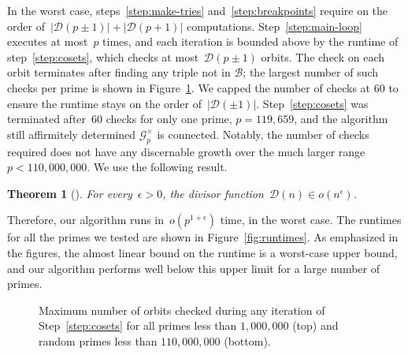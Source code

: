 \documentclass{article}
\newtheorem{theorem}{Theorem}
\theoremstyle{definition}
\theoremstyle{remark}
\begin{document}
In the worst case, steps~\ref{step:make-tries} and~\ref{step:breakpoints} require on the order of~$|\mathcal{D}(p \pm 1)| + |\mathcal{D}(p + 1)|$ computations.
Step~\ref{step:main-loop} executes at most~$p$ times, and each iteration is bounded above by the runtime of step~\ref{step:cosets}, which checks at most~$\mathcal{D}(p \pm 1)$ orbits.
The check on each orbit terminates after finding any triple not in $\mathcal{B}$; the largest number of such checks per prime is shown in Figure~\ref{fig:coset-checks}.
We capped the number of checks at 60 to ensure the runtime stays on the order of~$|\mathcal{D}(\pm 1)|$.
Step~\ref{step:cosets} was terminated after~60 checks for only one prime, $p = 119,659$, and the algorithm still affirmitely determined $\mathcal{G}_p^\times$ is connected.
Notably, the number of checks required does not have any discernable growth over the much larger range $p < 110,000,000$.
We use the following result.
\begin{theorem}[{\cite[theorem 315]{theory-of-numbers}}]
   For every~$\epsilon > 0$, the divisor function~$\mathcal{D}(n) \in o(n^\epsilon)$.
\end{theorem}
Therefore, our algorithm runs in~$o(p^{1 + \epsilon})$ time, in the worst case.
The runtimes for all the primes we tested are shown in Figure~\ref{fig:runtimes}.
As emphasized in the figures, the almost linear bound on the runtime is a worst-case upper bound, and our algorithm performs well below this upper limit for a large number of primes.

\begin{figure}[tbph]
\begin{center}
    

    
    \caption{Maximum number of orbits checked during any iteration of Step~\ref{step:cosets} for all primes less than $1,000,000$ (top) and random primes less than $110,000,000$ (bottom).}%
    \label{fig:coset-checks}
\end{center}
\end{figure}
\end{document}
